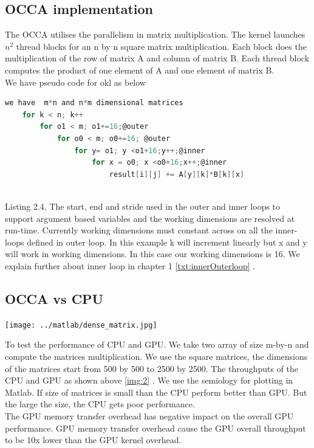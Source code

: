 \subsection{OCCA implementation}
The OCCA utilises the parallelism in matrix multiplication. The kernel launches $n^2$ thread blocks for an n by n square matrix multiplication. Each block does the multiplication of the row of matrix A and column of matrix B. Each thread block computes the product of one element of A and one element of matrix B.\\
We have pseudo code for okl as below
\begin{lstlisting}[language=C, caption=matrix multiplication in OCCA]
	we have  m*n and n*m dimensional matrices 
	for k < n; k++
		for o1 < m; o1+=16;@outer
			for o0 < m; o0+=16; @outer
				for y= o1; y <o1+16;y++;@inner
					for x = o0; x <o0+16;x++;@inner
						result[i][j] += A[y][k]*B[k][x]
	
\end{lstlisting}
Listing 2.4, The start, end and stride used in the outer and inner loops to support argument based variables and the working dimensions are resolved at run-time. Currently working dimensions must constant across on all the inner-loops defined in outer loop. In this example k will increment linearly but x and y will work in working dimensions. In this case our working dimensions is 16. We explain further about inner loop in chapter 1 \ref{txt:innerOuterloop} .
\subsection{OCCA vs CPU}
\begin{center}
	\texttt{[image: ../matlab/dense\_matrix.jpg]}
	\label{img:2}
\end{center}
To test the performance of CPU and GPU. We take two array of size m-by-n and compute the matrices multiplication. We use the square matrices, the dimensions of the matrices start from 500 by 500 to 2500 by 2500. The throughputs of the CPU and GPU as shown above \ref{img:2} . We use the semiology for plotting in Matlab. If size of matrices is small than the CPU perform better than GPU. But the large the size, the CPU gets poor performance.\\
	The GPU memory transfer overhead has negative impact on the overall GPU performance. GPU memory transfer overhead cause the GPU overall throughput to be 10x lower than the GPU kernel overhead. 



